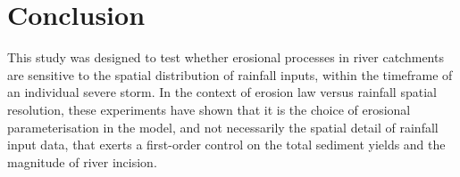                
%
%
                      
\section{Conclusion}
This study was designed to test whether erosional processes in river catchments are sensitive to the spatial distribution of rainfall inputs, within the timeframe of an individual severe storm. In the context of erosion law versus rainfall spatial resolution, these experiments have shown that it is the choice of erosional parameterisation in the model, and not necessarily the spatial detail of rainfall input data, that exerts a first-order control on the total sediment yields and the magnitude of river incision.

